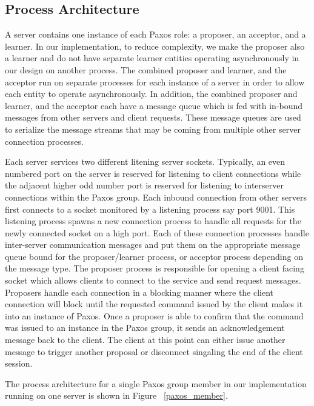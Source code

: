 \documentclass{article}
\begin{document}
\subsection{Process Architecture}

A server contains one instance of each Paxos role: a proposer, an acceptor, and a learner.
In our implementation, to reduce complexity, we make the proposer also a learner and do not have separate learner entities operating asynchronously in our design on another process.
The combined proposer and learner, and the acceptor run on separate processes for each instance of a server in order to allow each entity to operate asynchronously.
In addition, the combined proposer and learner, and the acceptor each have a message queue which is fed with in-bound messages from other servers and client requests.
These message queues are used to serialize the message streams that may be coming from multiple other server connection processes.

Each server services two different litening server sockets.
Typically, an even numbered port on the server is reserved for listening to client connections while the adjacent higher odd number port is reserved for listening to interserver connections within the Paxos group.
Each inbound connection from other servers first connects to a socket monitored by a listening process say port 9001.
This listening process spawns a new connection process to handle all requests for the newly connected socket on a high port.
Each of these connection processes handle inter-server communication messages and put them on the appropriate message queue bound for the proposer/learner process, or acceptor process depending on the message type.
The proposer process is responsible for opening a client facing socket which allows clients to connect to the service and send request messages.
Proposers handle each connection in a blocking manner where the client connection will block until the requested command issued by the client makes it into an instance of Paxos.
Once a proposer is able to confirm that the command was issued to an instance in the Paxos group, it sends an acknowledgement message back to the client.
The client at this point can either issue another message to trigger another proposal or disconnect singaling the end of the client session.

The process architecture for a single Paxos group member in our implementation running on one server is shown in Figure ~\ref{paxos_member}.
\end{document}
